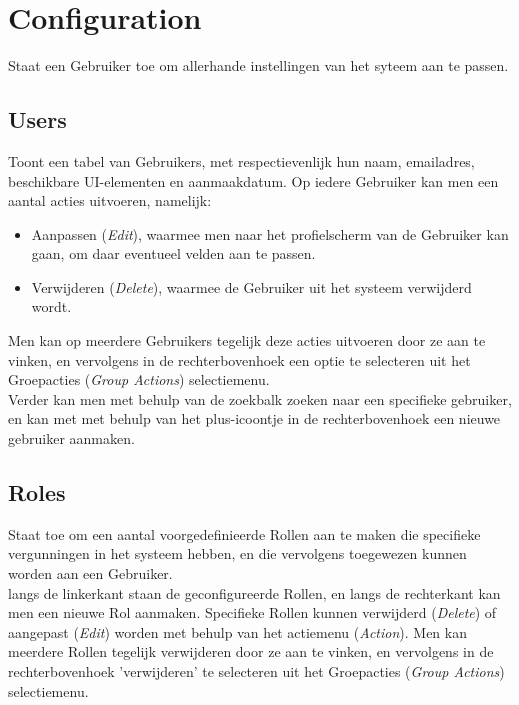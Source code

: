 \documentclass[]{memoir}
\begin{document}
\section{Configuration} \label{Configuration}
Staat een Gebruiker toe om allerhande instellingen van het syteem aan te passen.
\subsection{Users}
Toont een tabel van Gebruikers, met respectievenlijk hun naam, emailadres, beschikbare UI-elementen en aanmaakdatum. 
Op iedere Gebruiker kan men een aantal acties uitvoeren, namelijk:
\begin{itemize}
	\item Aanpassen (\textsl{Edit}), waarmee men naar het profielscherm van de Gebruiker kan gaan, om daar eventueel velden aan te passen.
	\item Verwijderen (\textsl{Delete}), waarmee de Gebruiker uit het systeem verwijderd wordt.
\end{itemize}
Men kan op meerdere Gebruikers tegelijk deze acties uitvoeren door ze aan te vinken, en vervolgens in de rechterbovenhoek een optie te selecteren uit het Groepacties  (\textsl{Group Actions}) selectiemenu.\\
Verder kan men met behulp van de zoekbalk zoeken naar een specifieke gebruiker, en kan met met behulp van het plus-icoontje in de rechterbovenhoek een nieuwe gebruiker aanmaken.

\subsection{Roles} \label{Roles}
Staat toe om een aantal voorgedefinieerde Rollen aan te maken die specifieke vergunningen in het systeem hebben, en die vervolgens toegewezen kunnen worden aan een Gebruiker.\\
langs de linkerkant staan de geconfigureerde Rollen, en langs de rechterkant kan men een nieuwe Rol aanmaken. 
Specifieke Rollen kunnen verwijderd (\textsl{Delete}) of aangepast (\textsl{Edit}) worden met behulp van het actiemenu (\textsl{Action}).
Men kan meerdere Rollen tegelijk verwijderen door ze aan te vinken, en vervolgens in de rechterbovenhoek 'verwijderen' te selecteren uit het Groepacties  (\textsl{Group Actions}) selectiemenu.\\
\end{document}
